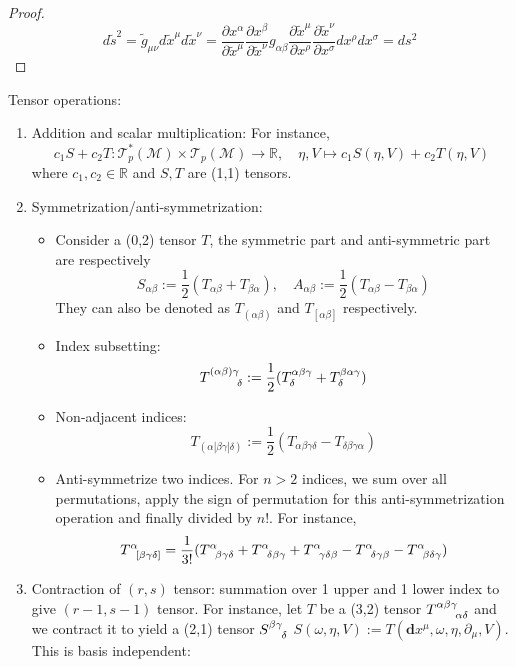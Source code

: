 \documentclass[a4paper]{article}
\theoremstyle{new}
\begin{document}
\begin{proof}
$$d\tilde{s}^2=\tilde{g}_{\mu\nu}d\tilde{x}^\mu d\tilde{x}^\nu=\frac{\partial x^\alpha}{\partial\tilde{x}^\mu}\frac{\partial x^\beta}{\partial\tilde{x}^\nu}g_{\alpha\beta}\frac{\partial\tilde{x}^\mu}{\partial x^\rho}\frac{\partial\tilde{x}^\nu}{\partial x^\sigma}dx^\rho dx^\sigma=ds^2$$
\end{proof}
Tensor operations:
\begin{enumerate}
    \item Addition and scalar multiplication: For instance,
    $$c_1S+c_2T:\mathcal{T}_p^*(\mathcal{M})\times \mathcal{T}_p(\mathcal{M})\rightarrow\mathbb{R},\quad\eta,V\mapsto c_1S(\eta,V)+c_2T(\eta,V)$$
    where $c_1,c_2\in\mathbb{R}$ and $S,T$ are (1,1) tensors.
    \item Symmetrization/anti-symmetrization:
    \begin{itemize}
        \item Consider a (0,2) tensor $T$, the symmetric part and anti-symmetric part are respectively
        $$S_{\alpha\beta}:=\frac{1}{2}(T_{\alpha\beta}+T_{\beta\alpha}),\quad A_{\alpha\beta}:=\frac{1}{2}(T_{\alpha\beta}-T_{\beta\alpha})$$
        They can also be denoted as $T_{(\alpha\beta)}$ and $T_{[\alpha\beta]}$ respectively.
        \item Index subsetting:
        $$\tensor*{T}{*_{}^{(\alpha\beta)\gamma}_{\delta}}:=\frac{1}{2}(T^{\alpha\beta\gamma}_\delta+T^{\beta\alpha\gamma}_\delta)$$
        \item Non-adjacent indices:
        $$T_{(\alpha|\beta\gamma|\delta)}:=\frac{1}{2}(T_{\alpha\beta\gamma\delta}-T_{\delta\beta\gamma\alpha})$$
        \item Anti-symmetrize two indices. For $n>2$ indices, we sum over all permutations, apply the sign of permutation for this anti-symmetrization operation and finally divided by $n!$. For instance,
        $$\tensor*{T}{*_{}^{\alpha}_{[\beta\gamma\delta]}}=\frac{1}{3!}(\tensor*{T}{*_{}^{\alpha}_{\beta\gamma\delta}}+\tensor*{T}{*_{}^{\alpha}_{\delta\beta\gamma}}+\tensor*{T}{*_{}^{\alpha}_{\gamma\delta\beta}}-\tensor*{T}{*_{}^{\alpha}_{\delta\gamma\beta}}-\tensor*{T}{*_{}^{\alpha}_{\beta\delta\gamma}})$$
    \end{itemize}
    \item Contraction of $(r,s)$ tensor: summation over 1 upper and 1 lower index to give $(r-1,s-1)$ tensor. For instance, let $T$ be a (3,2) tensor $\tensor*{T}{*_{}^{\alpha\beta\gamma}_{\alpha\delta}}$ and we contract it to yield a (2,1) tensor $\tensor*{S}{*_{}^{\beta\gamma}_{\delta}}$  $S(\omega,\eta,V):=T(\mathbf{d}x^\mu,\omega,\eta,\partial_\mu,V)$. This is basis independent:

\end{enumerate}
\end{document}
